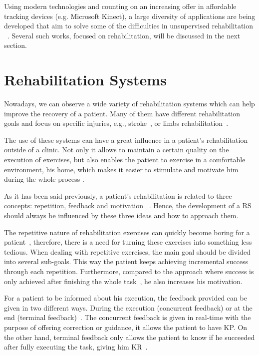 Using modern technologies and counting on an increasing offer in 
affordable tracking devices (e.g. Microsoft Kinect), a large
diversity of applications are being developed that aim to solve 
some of the difficulties in unsupervised rehabilitation ~\cite{Kitsunezaki2013,Borghese2013}. Several such works, focused on rehabilitation, will be discussed in the next section.



\section{Rehabilitation Systems}

Nowadays, we can observe a wide variety of rehabilitation systems which can help improve the recovery of a patient. 
Many of them have different rehabilitation goals and focus on specific injuries, e.g., stroke~\cite{Borghese2013,Design2005}, 
or limbs rehabilitation~\cite{Sadihov2013,Burke2009,Klein2013}.

The use of these systems can have a great influence in a patient's rehabilitation outside of a clinic. 
Not only it allows to maintain a certain quality on the execution of exercises, but also enables 
the patient to exercise in a comfortable environment, his home, which makes it easier to stimulate 
and motivate him during the whole process \cite{Borghese2013}.

As it has been said previously, a patient's rehabilitation is related to three concepts: repetition, feedback and motivation ~\cite{Schonauer2011a}. 
Hence, the development of a \ac{RS} should always be influenced by these three ideas and how to approach them. 

The repetitive nature of rehabilitation exercises can quickly become boring for a patient~\cite{Rego2010,Burke2009,Burdea2002}, 
therefore, there is a need for turning these exercises into something less tedious. 
When dealing with repetitive exercises, the main goal should be divided into several sub-goals. 
This way the patient keeps achieving incremental success through each repetition. 
Furthermore, compared to the approach where success is only achieved after finishing the whole task~\cite{Schonauer2011a}, he also increases his motivation.

For a patient to be informed about his execution, the feedback provided can be given in two different ways. During the execution
(concurrent feedback) or at the end (terminal feedback)~\cite{Sigrist2013}.
The concurrent feedback is given in real-time with the purpose of offering correction or guidance, 
it allows the patient to have \ac{KP}. On the other hand, terminal feedback only allows the patient 
to know if he succeeded after fully executing the task, giving him \ac{KR}~\cite{Design2005, Schonauer2011a}. 

